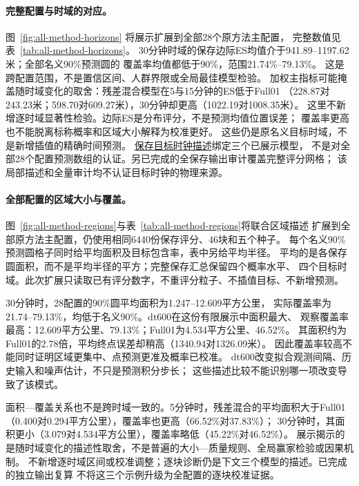 \documentclass[UTF8,11pt]{ctexart}
\begin{document}
\paragraph{完整配置与时域的对应。}
图~\ref{fig:all-method-horizons} 将展示扩展到全部28个原方法主配置，
完整数值见表~\ref{tab:all-method-horizons}。
30分钟时域的保存边际ES均值介于941.89--1197.62米；全部名义90\%预测圆的
覆盖率均值都低于90\%，范围21.74\%--79.13\%。
这是跨配置范围，不是置信区间、人群界限或全局最佳模型检验。
加权主指标可能掩盖随时域变化的取舍：残差混合模型在5与15分钟的ES低于Full01
（228.87对243.23米；598.70对609.27米），30分钟却更高（1022.19对1008.35米）。
这里不新增逐时域显著性检验。边际ES是分布评分，不是预测均值位置误差；
覆盖率更高也不能脱离标称概率和区域大小解释为校准更好。
这些仍是原名义目标时域，不是新增插值的精确时间预测。
\hyperref[sec:target-times]{保存目标时钟描述}绑定三个已展示模型，
不是对全部28个配置预测数组的认证。另已完成的全保存输出审计覆盖完整评分网格；
该局部描述和全量审计均不认证目标时钟的物理来源。


\FloatBarrier
\paragraph{全部配置的区域大小与覆盖。}
图~\ref{fig:all-method-regions}与表~\ref{tab:all-method-regions}将联合区域描述
扩展到全部原方法主配置，仍使用相同6440份保存评分、46块和五个种子。
每个名义90\%预测圆格子同时给平均面积及目标包含率，表中另给平均半径。
平均的是各保存圆面积，而不是平均半径的平方；完整保存汇总保留四个概率水平、
四个目标时域。此次扩展只读取已有评分数字，不重评分粒子、不插值目标、不新增预测。

30分钟时，28配置的90\%圆平均面积为1.247--12.609平方公里，
实际覆盖率为21.74--79.13\%，均低于名义90\%。dt600在这份有限展示中面积最大、
观察覆盖率最高：12.609平方公里、79.13\%；Full01为4.534平方公里、46.52\%。
其面积约为Full01的2.78倍，平均终点误差却稍高（1340.94对1326.09米）。
因此覆盖率较高不能同时证明区域更集中、点预测更准及概率已校准。
dt600改变拟合观测间隔、历史输入和噪声估计，不只是预测积分步长；
这些描述比较不能识别哪一项改变导致了该模式。

面积—覆盖关系也不是跨时域一致的。5分钟时，残差混合的平均面积大于Full01
（0.400对0.294平方公里），覆盖率也更高（66.52\%对37.83\%）；
30分钟时，其面积更小（3.079对4.534平方公里），覆盖率略低（45.22\%对46.52\%）。
展示揭示的是随时域变化的描述性取舍，不是普遍的大小—质量规则、全局赢家检验或因果机制。
不新增逐时域区间或校准调整；逐块诊断仍是下文三个模型的描述。已完成的独立输出复算
不将这三个示例升级为全配置的逐块校准证据。

\FloatBarrier
\end{document}
